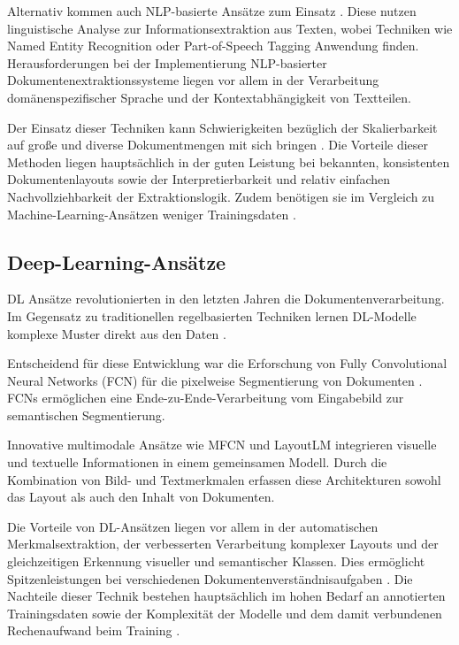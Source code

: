 Alternativ kommen auch NLP-basierte Ansätze zum Einsatz \parencite{ChowdhuryGobindaG.1999Tmfi, MarinaiS.2005Annf}. Diese nutzen linguistische Analyse zur Informationsextraktion aus Texten, wobei Techniken wie Named Entity Recognition oder Part-of-Speech Tagging Anwendung finden. Herausforderungen bei der Implementierung NLP-basierter Dokumentenextraktionssysteme liegen vor allem in der Verarbeitung domänenspezifischer Sprache und der Kontextabhängigkeit von Textteilen.

Der Einsatz dieser Techniken kann Schwierigkeiten bezüglich der Skalierbarkeit auf große und diverse Dokumentmengen mit sich bringen \parencite{ChowdhuryGobindaG.1999Tmfi, YeYibin2018Auso}. Die Vorteile dieser Methoden liegen hauptsächlich in der guten Leistung bei bekannten, konsistenten Dokumentenlayouts sowie der Interpretierbarkeit und relativ einfachen Nachvollziehbarkeit der Extraktionslogik. Zudem benötigen sie im Vergleich zu Machine-Learning-Ansätzen weniger Trainingsdaten \parencite{ChowdhuryGobindaG.1999Tmfi, MarinaiS.2005Annf}.

\subsection{Deep-Learning-Ansätze}
\label{subsec:deep-learning-ansätze}

\gls{DL} Ansätze revolutionierten in den letzten Jahren die Dokumentenverarbeitung. Im Gegensatz zu traditionellen regelbasierten Techniken lernen \gls{DL}-Modelle komplexe Muster direkt aus den Daten \parencite{YangXiao2017LtES, XuYiheng2020LPoT}.

Entscheidend für diese Entwicklung war die Erforschung von Fully Convolutional Neural Networks (FCN) für die pixelweise Segmentierung von Dokumenten \parencite{YangXiao2017LtES}. FCNs ermöglichen eine Ende-zu-Ende-Verarbeitung vom Eingabebild zur semantischen Segmentierung.

Innovative multimodale Ansätze wie MFCN \parencite{YangXiao2017LtES} und LayoutLM \parencite{XuYiheng2020LPoT} integrieren visuelle und textuelle Informationen in einem gemeinsamen Modell. Durch die Kombination von Bild- und Textmerkmalen erfassen diese Architekturen sowohl das Layout als auch den Inhalt von Dokumenten.

Die Vorteile von \gls{DL}-Ansätzen liegen vor allem in der automatischen Merkmalsextraktion, der verbesserten Verarbeitung komplexer Layouts und der gleichzeitigen Erkennung visueller und semantischer Klassen. Dies ermöglicht Spitzenleistungen bei verschiedenen Dokumentenverständnisaufgaben \parencite{YangXiao2017LtES, XuYiheng2020LPoT}. Die Nachteile dieser Technik bestehen hauptsächlich im hohen Bedarf an annotierten Trainingsdaten sowie der Komplexität der Modelle und dem damit verbundenen Rechenaufwand beim Training \parencite{YangXiao2017LtES, XuYiheng2020LPoT}.

